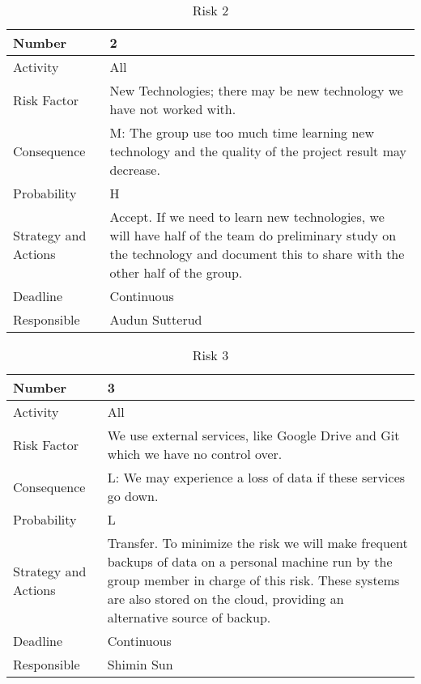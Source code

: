 \documentclass[../document.tex]{subfiles}
\begin{document}
\begin{table}[H]
\caption{Risk 2}
\begin{tabularx}{\textwidth}{|l|X|}
\hline
Number
&2
\\ \hline Activity
&All
\\ \hline Risk Factor
&New Technologies; there may be new technology we have not worked with.
\\ \hline Consequence
&M: The group use too much time learning new technology and the quality of the project result may decrease.
\\ \hline Probability
&H
\\ \hline Strategy and Actions
&Accept. If we need to learn new technologies, we will have half of the team do preliminary study on the technology and document this to share with the other half of the group.
\\ \hline Deadline
&Continuous
\\ \hline Responsible
&Audun Sutterud
\\ \hline 
\end{tabularx}
\end{table}

\begin{table}[H]
\caption{Risk 3}
\begin{tabularx}{\textwidth}{|l|X|}
\hline
Number
&3
\\ \hline Activity
&All
\\ \hline Risk Factor
&We use external services, like Google Drive and Git which we have no control over.
\\ \hline Consequence
&L: We may experience a loss of data if these services go down.
\\ \hline Probability
&L
\\ \hline Strategy and Actions
&Transfer. To minimize the risk we will make frequent backups of data on a personal machine run by the group member in charge of this risk. These systems are also stored on the cloud, providing an alternative source of backup.
\\ \hline Deadline
&Continuous
\\ \hline Responsible
&Shimin Sun
\\ \hline 
\end{tabularx}
\end{table}
\end{document}
